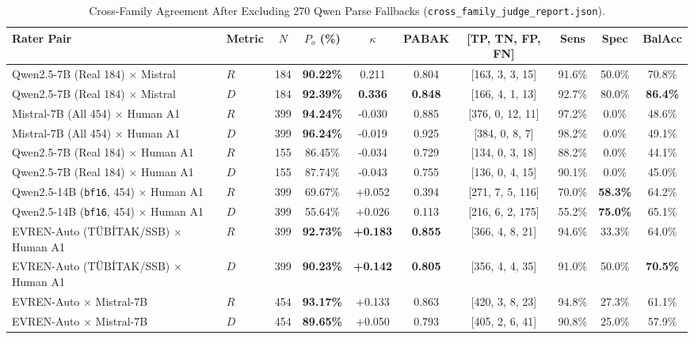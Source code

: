 \documentclass[a4paper,12pt]{report}
\begin{document}
\begin{table}[htbp]
\centering
\small
\caption{Cross-Family Agreement After Excluding 270 Qwen Parse Fallbacks (\texttt{cross\_family\_judge\_report.json}).}
\label{tab:cross_family_judge}
\scriptsize\setlength{\tabcolsep}{1.5pt}
\begin{tabularx}{\textwidth}{>{\RaggedRight\arraybackslash}X>{\RaggedRight\arraybackslash}Xcccccccc}
\toprule
\textbf{Rater Pair} & \textbf{Metric} & \textbf{$N$} & \textbf{$P_o$ (\%)} & \textbf{$\kappa$} & \textbf{PABAK} & \textbf{[TP, TN, FP, FN]} & \textbf{Sens} & \textbf{Spec} & \textbf{BalAcc} \\
\midrule
Qwen2.5-7B (Real 184) $\times$ Mistral & $R$ & 184 & \textbf{90.22\%} & 0.211 & 0.804 & [163, 3, 3, 15] & 91.6\% & 50.0\% & 70.8\% \\
Qwen2.5-7B (Real 184) $\times$ Mistral & $D$ & 184 & \textbf{92.39\%} & \textbf{0.336} & \textbf{0.848} & [166, 4, 1, 13] & 92.7\% & 80.0\% & \textbf{86.4\%} \\
\midrule
Mistral-7B (All 454) $\times$ Human A1 & $R$ & 399 & \textbf{94.24\%} & -0.030 & 0.885 & [376, 0, 12, 11] & 97.2\% & 0.0\% & 48.6\% \\
Mistral-7B (All 454) $\times$ Human A1 & $D$ & 399 & \textbf{96.24\%} & -0.019 & 0.925 & [384, 0, 8, 7] & 98.2\% & 0.0\% & 49.1\% \\
\midrule
Qwen2.5-7B (Real 184) $\times$ Human A1 & $R$ & 155 & 86.45\% & -0.034 & 0.729 & [134, 0, 3, 18] & 88.2\% & 0.0\% & 44.1\% \\
Qwen2.5-7B (Real 184) $\times$ Human A1 & $D$ & 155 & 87.74\% & -0.043 & 0.755 & [136, 0, 4, 15] & 90.1\% & 0.0\% & 45.0\% \\
\midrule
Qwen2.5-14B (\texttt{bf16}, 454) $\times$ Human A1 & $R$ & 399 & 69.67\% & +0.052 & 0.394 & [271, 7, 5, 116] & 70.0\% & \textbf{58.3\%} & 64.2\% \\
Qwen2.5-14B (\texttt{bf16}, 454) $\times$ Human A1 & $D$ & 399 & 55.64\% & +0.026 & 0.113 & [216, 6, 2, 175] & 55.2\% & \textbf{75.0\%} & 65.1\% \\
\midrule
EVREN-Auto (TÜBİTAK/SSB) $\times$ Human A1 & $R$ & 399 & \textbf{92.73\%} & \textbf{+0.183} & \textbf{0.855} & [366, 4, 8, 21] & 94.6\% & 33.3\% & 64.0\% \\
EVREN-Auto (TÜBİTAK/SSB) $\times$ Human A1 & $D$ & 399 & \textbf{90.23\%} & \textbf{+0.142} & \textbf{0.805} & [356, 4, 4, 35] & 91.0\% & 50.0\% & \textbf{70.5\%} \\
\midrule
EVREN-Auto $\times$ Mistral-7B & $R$ & 454 & \textbf{93.17\%} & +0.133 & 0.863 & [420, 3, 8, 23] & 94.8\% & 27.3\% & 61.1\% \\
EVREN-Auto $\times$ Mistral-7B & $D$ & 454 & \textbf{89.65\%} & +0.050 & 0.793 & [405, 2, 6, 41] & 90.8\% & 25.0\% & 57.9\% \\
\bottomrule
\end{tabularx}
\end{table}
\end{document}
